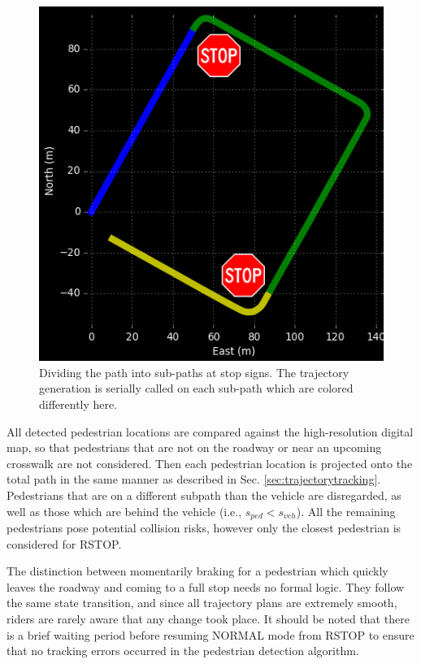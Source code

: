 \documentclass[letterpaper, 10 pt, conference]{ieeeconf}  %
\begin{document}
\begin{figure}[thpb]
  \centering
  \includegraphics[width=0.5\columnwidth]{graphics/Subpaths.png}
  \caption{
    Dividing the path into sub-paths at stop signs.
    The trajectory generation is serially called on each sub-path which are colored differently here.
  }
  \label{fig:subpathdivision}
\end{figure}

All detected pedestrian locations are compared against the high-resolution digital map, so that pedestrians that are not on the roadway or near an upcoming crosswalk are not considered.
Then each pedestrian location is projected onto the total path in the same manner as described in Sec. \ref{sec:trajectorytracking}.
Pedestrians that are on a different subpath than the vehicle are disregarded, as well as those which are behind the vehicle (i.e., $s_{ped} < s_{veh}$).
All the remaining pedestrians pose potential collision risks, however only the closest pedestrian is considered for RSTOP.

The distinction between momentarily braking for a pedestrian which quickly leaves the roadway and coming to a full stop needs no formal logic.
They follow the same state transition, and since all trajectory plans are extremely smooth, riders are rarely aware that any change took place.
It should be noted that there is a brief waiting period before resuming NORMAL mode from RSTOP to ensure that no tracking errors occurred in the pedestrian detection algorithm.
\end{document}

